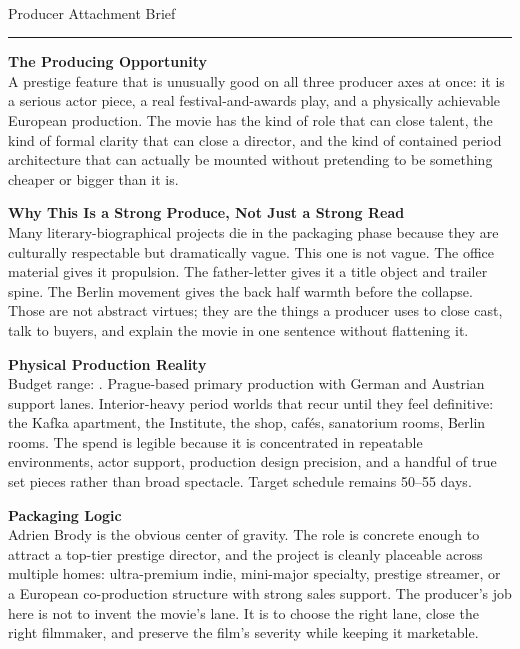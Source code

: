 \documentclass[11pt,letterpaper]{article}
\begin{document}
\begin{center}
{\Large\bfseries\sffamily \filmtitleupper}\\[3pt]
{\normalsize\sffamily\color{kafkagray} Producer Attachment Brief}
\end{center}
\vspace{2pt}
\textcolor{sectionrule}{\rule{\textwidth}{0.5pt}}
\vspace{4pt}

\textbf{The Producing Opportunity}\\
A prestige feature that is unusually good on all three producer axes at once: it is a serious actor piece, a real festival-and-awards play, and a physically achievable European production. The movie has the kind of role that can close talent, the kind of formal clarity that can close a director, and the kind of contained period architecture that can actually be mounted without pretending to be something cheaper or bigger than it is.

\vspace{2pt}

\textbf{Why This Is a Strong Produce, Not Just a Strong Read}\\
Many literary-biographical projects die in the packaging phase because they are culturally respectable but dramatically vague. This one is not vague. The office material gives it propulsion. The father-letter gives it a title object and trailer spine. The Berlin movement gives the back half warmth before the collapse. Those are not abstract virtues; they are the things a producer uses to close cast, talk to buyers, and explain the movie in one sentence without flattening it.

\vspace{2pt}

\textbf{Physical Production Reality}\\
Budget range: \filmbudgetrange. Prague-based primary production with German and Austrian support lanes. Interior-heavy period worlds that recur until they feel definitive: the Kafka apartment, the Institute, the shop, cafés, sanatorium rooms, Berlin rooms. The spend is legible because it is concentrated in repeatable environments, actor support, production design precision, and a handful of true set pieces rather than broad spectacle. Target schedule remains 50--55 days.

\vspace{2pt}

\textbf{Packaging Logic}\\
Adrien Brody is the obvious center of gravity. The role is concrete enough to attract a top-tier prestige director, and the project is cleanly placeable across multiple homes: ultra-premium indie, mini-major specialty, prestige streamer, or a European co-production structure with strong sales support. The producer's job here is not to invent the movie's lane. It is to choose the right lane, close the right filmmaker, and preserve the film's severity while keeping it marketable.
\end{document}
